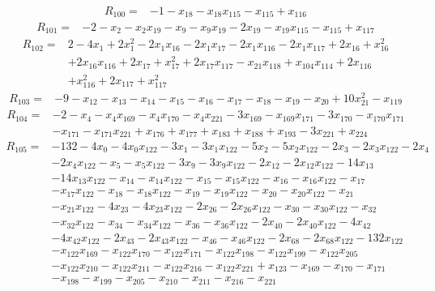 \[\begin{aligned}R_{100}={}&-1-x_{18}-x_{18}x_{115}-x_{115}+x_{116}
\end{aligned}\]
\[\begin{aligned}R_{101}={}&-2-x_{2}-x_{2}x_{19}-x_{9}-x_{9}x_{19}-2x_{19}-x_{19}x_{115}-x_{115}+x_{117}
\end{aligned}\]
\[\begin{aligned}R_{102}={}&2-4x_{1}+2x_{1}^{2}-2x_{1}x_{16}-2x_{1}x_{17}-2x_{1}x_{116}-2x_{1}x_{117}+2x_{16}+x_{16}^{2}
\\&+2x_{16}x_{116}+2x_{17}+x_{17}^{2}+2x_{17}x_{117}-x_{21}x_{118}+x_{104}x_{114}+2x_{116}
\\&+x_{116}^{2}+2x_{117}+x_{117}^{2}
\end{aligned}\]
\[\begin{aligned}R_{103}={}&-9-x_{12}-x_{13}-x_{14}-x_{15}-x_{16}-x_{17}-x_{18}-x_{19}-x_{20}+10x_{21}^{2}-x_{119}
\end{aligned}\]
\[\begin{aligned}R_{104}={}&-2-x_{4}-x_{4}x_{169}-x_{4}x_{170}-x_{4}x_{221}-3x_{169}-x_{169}x_{171}-3x_{170}-x_{170}x_{171}
\\&-x_{171}-x_{171}x_{221}+x_{176}+x_{177}+x_{183}+x_{188}+x_{193}-3x_{221}+x_{224}
\end{aligned}\]
\[\begin{aligned}R_{105}={}&-132-4x_{0}-4x_{0}x_{122}-3x_{1}-3x_{1}x_{122}-5x_{2}-5x_{2}x_{122}-2x_{3}-2x_{3}x_{122}-2x_{4}
\\&-2x_{4}x_{122}-x_{5}-x_{5}x_{122}-3x_{9}-3x_{9}x_{122}-2x_{12}-2x_{12}x_{122}-14x_{13}
\\&-14x_{13}x_{122}-x_{14}-x_{14}x_{122}-x_{15}-x_{15}x_{122}-x_{16}-x_{16}x_{122}-x_{17}
\\&-x_{17}x_{122}-x_{18}-x_{18}x_{122}-x_{19}-x_{19}x_{122}-x_{20}-x_{20}x_{122}-x_{21}
\\&-x_{21}x_{122}-4x_{23}-4x_{23}x_{122}-2x_{26}-2x_{26}x_{122}-x_{30}-x_{30}x_{122}-x_{32}
\\&-x_{32}x_{122}-x_{34}-x_{34}x_{122}-x_{36}-x_{36}x_{122}-2x_{40}-2x_{40}x_{122}-4x_{42}
\\&-4x_{42}x_{122}-2x_{43}-2x_{43}x_{122}-x_{46}-x_{46}x_{122}-2x_{68}-2x_{68}x_{122}-132x_{122}
\\&-x_{122}x_{169}-x_{122}x_{170}-x_{122}x_{171}-x_{122}x_{198}-x_{122}x_{199}-x_{122}x_{205}
\\&-x_{122}x_{210}-x_{122}x_{211}-x_{122}x_{216}-x_{122}x_{221}+x_{123}-x_{169}-x_{170}-x_{171}
\\&-x_{198}-x_{199}-x_{205}-x_{210}-x_{211}-x_{216}-x_{221}
\end{aligned}\]
